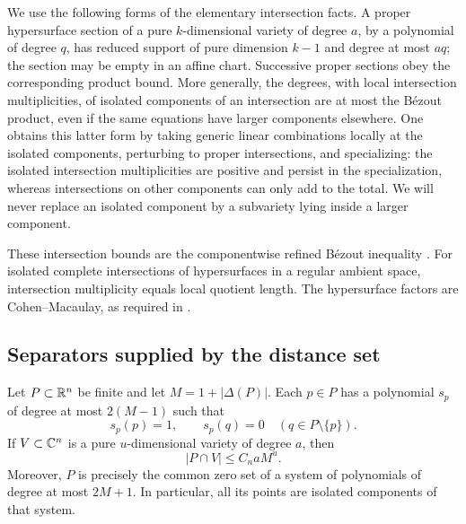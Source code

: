 We use the following forms of the elementary intersection facts.  A
proper hypersurface section of a pure $k$-dimensional variety of degree
$a$, by a polynomial of degree $q$, has reduced support of pure dimension
$k-1$ and degree at most $aq$; the section may be empty in an affine
chart.  Successive proper sections obey the corresponding product bound.
More generally, the degrees, with local intersection multiplicities, of
isolated components of an intersection are at most the B\'ezout product,
even if the same equations have larger components elsewhere.  One obtains
this latter form by taking generic linear combinations locally at the
isolated components, perturbing to proper intersections, and specializing:
the isolated intersection multiplicities are positive and persist in the
specialization, whereas intersections on other components can only add
to the total.  We will never replace an isolated component by a
subvariety lying inside a larger component.

These intersection bounds are the componentwise refined B\'ezout
inequality \cite[Theorem~12.3 and Example~12.3.1]{fulton1998}.
For isolated complete intersections of hypersurfaces in a regular
ambient space, intersection multiplicity equals local quotient length.
The hypersurface factors are Cohen--Macaulay, as required in
\cite[Example~12.3.7(ii)--(iii)]{fulton1998}.

\subsection{Separators supplied by the distance set}

\begin{lemma}\label{poly:separators}
Let $P\subset\mathbb R^n$ be finite and let $M=1+|\Delta(P)|$.  Each $p\in P$
has a polynomial $s_p$ of degree at most $2(M-1)$ such that
\[
 s_p(p)=1,\qquad s_p(q)=0\quad(q\in P\setminus\{p\}).
\]
If $V\subset\mathbb C^n$ is a pure $u$-dimensional variety of degree $a$, then
\begin{equation}\label{poly:physical-count}
 |P\cap V|\le C_n aM^u.
\end{equation}
Moreover, $P$ is precisely the common zero set of a system of polynomials
of degree at most $2M+1$.  In particular, all its points are isolated
components of that system.
\end{lemma}

